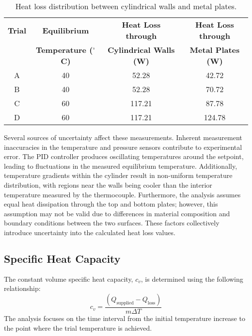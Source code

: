 \documentclass[12pt]{article}
\begin{document}
\begin{table}[h!]
\centering
\caption{Heat loss distribution between cylindrical walls and metal plates.}
\label{tab:plateloss}
\begin{tabular}{@{}cccc@{}}
\toprule
\textbf{Trial} & \textbf{Equilibrium} & \textbf{Heat Loss through} & \textbf{Heat Loss through} \\
& \textbf{Temperature ($^{\circ}$C)} & \textbf{Cylindrical Walls (W)} & \textbf{Metal Plates (W)} \\
\midrule
A & 40 & 52.28 & 42.72 \\
B & 40 & 52.28 & 70.72 \\
C & 60 & 117.21 & 87.78 \\
D & 60 & 117.21 & 124.78 \\
\bottomrule
\end{tabular}
\end{table}

Several sources of uncertainty affect these measurements. Inherent measurement inaccuracies in the temperature and pressure sensors contribute to experimental error. The PID controller produces oscillating temperatures around the setpoint, leading to fluctuations in the measured equilibrium temperature. Additionally, temperature gradients within the cylinder result in non-uniform temperature distribution, with regions near the walls being cooler than the interior temperature measured by the thermocouple. Furthermore, the analysis assumes equal heat dissipation through the top and bottom plates; however, this assumption may not be valid due to differences in material composition and boundary conditions between the two surfaces. These factors collectively introduce uncertainty into the calculated heat loss values.

\subsection{Specific Heat Capacity}

The constant volume specific heat capacity, \(c_v\), is determined using the following relationship:
\[
c_v = \frac{(Q_{\text{supplied}} - Q_{\text{loss}})}{m\Delta T}
\]
The analysis focuses on the time interval from the initial temperature increase to the point where the trial temperature is achieved.
\end{document}
